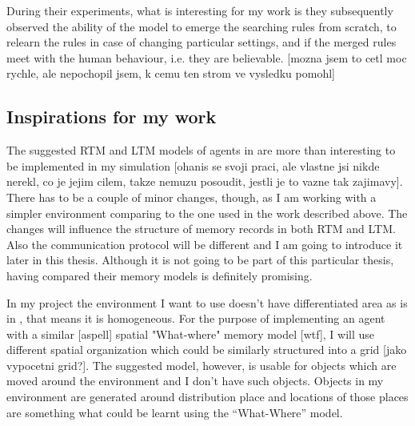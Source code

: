 During their experiments, what is interesting for my work is they subsequently observed the ability of the model to emerge the searching rules from scratch, to relearn the rules in case of changing particular settings, and if the merged rules meet with the human behaviour, i.e. they are believable. [mozna jsem to cetl moc rychle, ale nepochopil jsem, k cemu ten strom ve vysledku pomohl]
                 
\subsection{Inspirations for my work}

The suggested RTM and LTM models of agents in \cite{Ho:memoryarchitectures} are more than interesting to be implemented in my simulation [ohanis se svoji praci, ale vlastne jsi nikde nerekl, co je jejim cilem, takze nemuzu posoudit, jestli je to vazne tak zajimavy]. There has to be a couple of minor changes, though, as I am working with a simpler environment comparing to the one used in the work described above. The changes will influence the structure of memory records in both RTM and LTM. Also the communication protocol will be different and I am going to introduce it later in this thesis. Although it is not going to be part of this particular thesis, having compared their memory models is definitely promising.

In my project the environment I want to use doesn’t have differentiated area as is in \cite{Brom:placeandobjects}, that means it is homogeneous. For the purpose of implementing an agent with a similar [aspell] spatial "What-where" memory model [wtf], I will use different spatial organization which could be similarly structured into a grid [jako vypocetni grid?].  The suggested model, however, is usable for objects which are moved around the environment and I don’t have such objects. Objects in my environment are generated around distribution place and locations of those places are something what could be learnt using the “What-Where” model. 